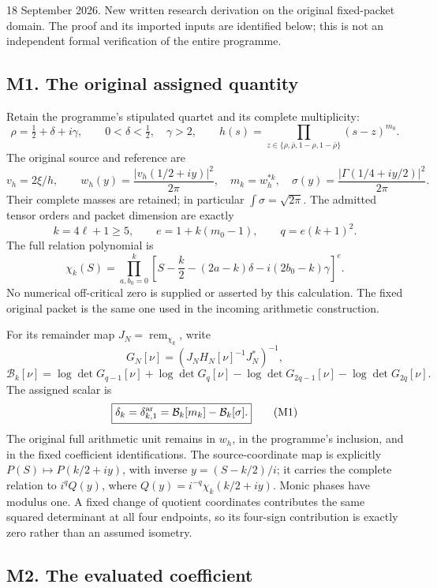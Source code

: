\documentclass[11pt,a4paper]{article}
\begin{document}
18 September 2026. New written research derivation on the original
fixed-packet domain. The proof and its imported inputs are identified
below; this is not an independent formal verification of the entire
programme.

\subsection{M1. The original assigned
quantity}\label{sa:m1.-the-original-assigned-quantity}

Retain the programme's stipulated quartet and its complete multiplicity:
\[
\rho=\tfrac12+\delta+i\gamma,\qquad 0<\delta<\tfrac12,\quad\gamma>2,
\qquad h(s)=\prod_{z\in\{\rho,\bar\rho,1-\rho,1-\bar\rho\}}(s-z)^{m_0}.
\] The original source and reference are \[
v_h=2\xi/h,\qquad w_h(y)=\frac{|v_h(1/2+iy)|^2}{2\pi},
\quad m_k=w_h^{*k},\quad
\sigma(y)=\frac{|\Gamma(1/4+iy/2)|^2}{2\pi}.
\] Their complete masses are retained; in particular
\(\int\sigma=\sqrt{2\pi}\). The admitted tensor orders and packet
dimension are exactly \[
k=4\ell+1\ge5,\qquad e=1+k(m_0-1),\qquad q=e(k+1)^2.
\] The full relation polynomial is \[
\chi_k(S)=\prod_{a,b_0=0}^k
\left[S-\frac k2-(2a-k)\delta-i(2b_0-k)\gamma\right]^e.
\] No numerical off-critical zero is supplied or asserted by this
calculation. The fixed original packet is the same one used in the
incoming arithmetic construction.

For its remainder map \(J_N=\operatorname{rem}_{\chi_k}\), write \[
G_N[\nu]=(J_NH_N[\nu]^{-1}J_N^*)^{-1},
\] \[
\mathcal B_k[\nu]=\log\det G_{q-1}[\nu]+\log\det G_q[\nu]
-\log\det G_{2q-1}[\nu]-\log\det G_{2q}[\nu].
\] The assigned scalar is \[
\boxed{\delta_k=\delta_{k,1}^{\rm ar}
=\mathcal B_k[m_k]-\mathcal B_k[\sigma].}\tag{M1}
\] The original full arithmetic unit remains in \(w_h\), in the
programme's inclusion, and in the fixed coefficient identifications. The
source-coordinate map is explicitly \(P(S)\mapsto P(k/2+iy)\), with
inverse \(y=(S-k/2)/i\); it carries the complete relation to
\(i^qQ(y)\), where \(Q(y)=i^{-q}\chi_k(k/2+iy)\). Monic phases have
modulus one. A fixed change of quotient coordinates contributes the same
squared determinant at all four endpoints, so its four-sign contribution
is exactly zero rather than an assumed isometry.

\subsection{M2. The evaluated
coefficient}\label{sa:m2.-the-evaluated-coefficient}
\end{document}
